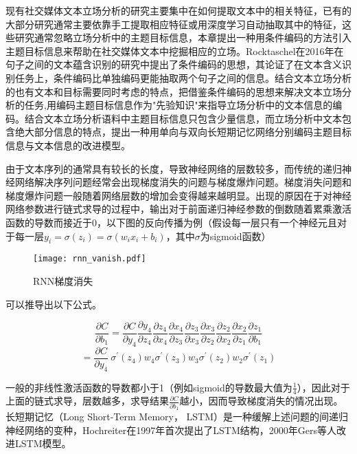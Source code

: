 现有社交媒体文本立场分析的研究主要集中在如何提取文本中的相关特征，已有的大部分研究通常主要依靠手工提取相应特征或用深度学习自动抽取其中的特征，这些研究通常忽略立场分析中的主题目标信息，本章提出一种用条件编码的方法引入主题目标信息来帮助在社交媒体文本中挖掘相应的立场。Rocktaschel在2016年在句子之间的文本蕴含识别的研究中提出了条件编码的思想，其论证了在文本含义识别任务上，条件编码比单独编码更能抽取两个句子之间的信息。结合文本立场分析的也有文本和目标需要同时考虑的特点，把借鉴条件编码的思想来解决文本立场分析的任务,用编码主题目标信息作为"先验知识"来指导立场分析中的文本信息的编码。结合文本立场分析语料中主题目标信息只包含少量信息，而立场分析中文本包含绝大部分信息的特点，提出一种用单向与双向长短期记忆网络分别编码主题目标信息与文本信息的改进模型。

由于文本序列的通常具有较长的长度，导致神经网络的层数较多，而传统的递归神经网络解决序列问题经常会出现梯度消失的问题与梯度爆炸问题。梯度消失问题和梯度爆炸问题一般随着网络层数的增加会变得越来越明显。出现的原因在于对神经网络参数进行链式求导的过程中，输出对于前面递归神经参数的倒数随着累乘激活函数的导数而接近于0，以下图的反向传播为例（假设每一层只有一个神经元且对于每一层$y_i=\sigma(z_i)=\sigma(w_ix_i+b_i)$，其中$\sigma$为sigmoid函数）

\begin{figure}[htbp]
	\centering
	\texttt{[image: rnn\_vanish.pdf]}
	\caption[rnn_vanish]{RNN梯度消失}
\end{figure}

可以推导出以下公式。

\begin{equation}\label{nodelimiter}
\frac{\partial C}{\partial b_1} = \frac{\partial C}{\partial y_4}\frac{\partial y_4}{\partial z_4}\frac{\partial z_4}{\partial x_4}\frac{\partial x_4}{\partial z_3}\frac{\partial z_3}{\partial x_3}\frac{\partial x_3}{\partial z_2}\frac{\partial z_2}{\partial x_2}\frac{\partial x_2}{\partial z_1}\frac{\partial z_1}{\partial b_1}
\end{equation}
\begin{equation}\label{delimiter}
=\frac{\partial C}{\partial y_4}\ \sigma ^\prime(z_4)w_4\sigma ^\prime(z_3)w_3\sigma ^\prime(z_2)w_2\sigma ^\prime(z_1)
\end{equation}

一般的非线性激活函数的导数都小于1（例如sigmoid的导数最大值为$\frac{1}{4}$），因此对于上面的链式求导，层数越多，求导结果$\frac{\partial C}{\partial b_1}$越小，因而导致梯度消失的情况出现。
长短期记忆（Long Short-Term Memory， LSTM）是一种缓解上述问题的间递归神经网络的变种，Hochreiter在1997年首次提出了LSTM结构，2000年Gers等人改进LSTM模型。

